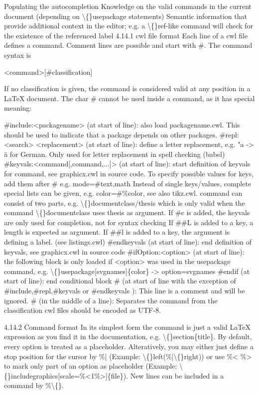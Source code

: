 \documentclass{article}
\begin{document}
	Populating the autocompletion
	Knowledge on the valid commands in the current document (depending on \textbackslash\{\}usepackage statements)
	Semantic information that provide additional context in the editor; e.g. a \textbackslash\{\}ref-like command will check for the existence of the referenced label
	4.14.1 cwl file format
	Each line of a cwl file defines a command. Comment lines are possible and start with \#. The command syntax is
	
	<command>[\#classification]
	
	If no classification is given, the command is considered valid at any position in a LaTeX document. The char \# cannot be used inside a command, as it has special meaning:
	
	\#include:<packagename> (at start of line): also load packagename.cwl. This should be used to indicate that a package depends on other packages.
	\#repl:<search> <replacement> (at start of line): define a letter replacement, e.g. "a -> ä for German. Only used for letter replacement in spell checking (babel)
	\#keyvals:<command[,command,...]> (at start of line): start definition of keyvals for command, see graphicx.cwl in source code. To specify possible values for keys, add them after \# e.g. mode=\#text,math
	Instead of single keys/values, complete special lists can be given, e.g. color=\#\%color, see also tikz.cwl.
	command can consist of two parts, e.g. \textbackslash\{\}documentclass/thesis which is only valid when the command \textbackslash\{\}documentclass uses thesis as argument.
	If \#c is added, the keyvals are only used for completion, not for syntax checking
	If \#\#L is added to a key, a length is expected as argument.
	If \#\#l is added to a key, the argument is defining a label. (see listings.cwl)
	\#endkeyvals (at start of line): end definition of keyvals, see graphicx.cwl in source code
	\#ifOption:<option> (at start of line): the following block is only loaded if <option> was used in the usepackage command, e.g. \textbackslash\{\}usepackage[svgnames]\{color\} -> option=svgnames
	\#endif (at start of line): end conditional block
	\# (at start of line with the exception of \#include,\#repl,\#keyvals or \#endkeyvals ): This line is a comment and will be ignored.
	\# (in the middle of a line): Separates the command from the classification
	cwl files should be encoded as UTF-8.
	
	4.14.2 Command format
	In its simplest form the command is just a valid LaTeX expression as you find it in the documentation, e.g. \textbackslash\{\}section\{title\}. By default, every option is treated as a placeholder. Alteratively, you may either just define a stop position for the cursor by \%| (Example: \textbackslash\{\}left(\%|\textbackslash\{\}right)) or use \%< \%> to mark only part of an option as placeholder (Example: \textbackslash\{\}includegraphics[scale=\%<1\%>]\{file\}). New lines can be included in a command by \%\textbackslash\{\}.
	
\end{document}
